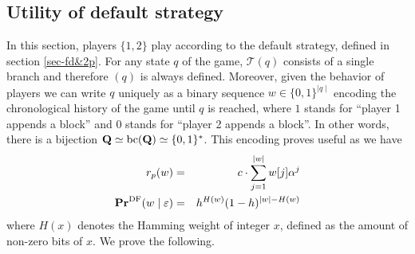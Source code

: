 %
%
%
%
\subsection{Utility of default strategy}
In this section, players $\{1,2\}$ play according to the default strategy, defined in section \ref{sec-fd&2p}. For any state $q$ of the game, $\mathcal{T}(q)$ consists of a single branch and therefore \bchain$(q)$ is always defined. Moreover, given the behavior of players we can write $q$ uniquely as a binary sequence $w\in\{0,1\}^{\mid q\mid }$ encoding the chronological history of the game until $q$ is reached, where $1$ stands for ``player 1 appends a block'' and $0$ stands for ``player 2 appends a block''. In other words, there is a bijection $ \mathbf{Q} \simeq\text{bc}(\mathbf{Q})\simeq \{0,1\}^\ast$. This encoding proves useful as we have
\begin{eqnarray*}
	r_p(w) &=&	c\cdot \sum_{j=1}^{\mid w\mid}w[j] \alpha^j  \\
	\mathbf{Pr}^{\text{\rm DF}}(w \mid \varepsilon) &=&	h^{H(w)}(1-h)^{|w|-H(w)}
\end{eqnarray*}
where $H(x)$ denotes the Hamming weight of integer $x$, defined as the amount of non-zero bits of $x$. We prove the following.


